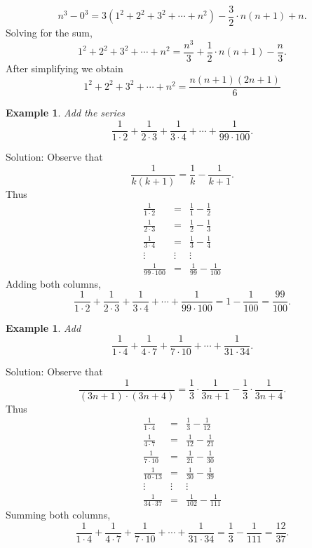 \documentclass[11pt, openany]{book}
\theoremstyle{change} \theoremheaderfont{\blue\sffamily\bfseries}
\newtheorem{exa}[thm]{Example}
\theoremstyle{nonumberplain} \theoremheaderfont{\sffamily\bfseries}
\newcommand{\í}{\'{\i}}
\begin{document}
$$n^3 - 0^3 = 3(1^2 + 2^2 + 3^2 + \cdots  + n^2) - \frac{3}{2}\cdot n(n + 1) + n.$$
Solving for the sum,
$$1^2 + 2^2 + 3^2 + \cdots + n^2 = \frac{n^3}{3}  + \frac{1}{2}\cdot n(n + 1) - \frac{n}{3}.$$
After simplifying we obtain
\begin{equation}
1^2 + 2^2 + 3^2 + \cdots + n^2 = \frac{n(n + 1)(2n + 1)}{6}
\end{equation}



\begin{exa} Add the series
$$\frac{1}{1\cdot 2} + \frac{1}{2\cdot 3} + \frac{1}{3\cdot 4} + \cdots
+ \frac{1}{99\cdot 100} .$$ \end{exa} Solution: Observe that
$$ \frac{1}{k(k + 1)} = \frac{1}{k} - \frac{1}{k + 1}.$$Thus
$$
\begin{array}{lcl}
\frac{1}{1\cdot 2} & =  &\frac{1}{1} - \frac{1}{2} \\
\frac{1}{2\cdot 3} & =  &\frac{1}{2} - \frac{1}{3} \\
\frac{1}{3\cdot 4} & =  &\frac{1}{3} - \frac{1}{4} \\
\vdots & \vdots & \vdots \\
\frac{1}{99\cdot 100} & =  &\frac{1}{99} - \frac{1}{100}
\end{array}
$$
Adding both columns,
$$\frac{1}{1\cdot 2} + \frac{1}{2\cdot 3} + \frac{1}{3\cdot 4} + \cdots
+ \frac{1}{99\cdot 100} = 1 - \frac{1}{100} = \frac{99}{100}.$$
\begin{exa} Add
$$ \frac{1}{1\cdot 4} + \frac{1}{4\cdot 7} + \frac{1}{7\cdot 10} + \cdots + \frac{1}{31\cdot 34}.$$
\end{exa}
Solution: Observe that
$$ \frac{1}{(3n + 1)\cdot (3n + 4)} = \frac{1}{3}\cdot \frac{1}{3n + 1} - \frac{1}{3}\cdot\frac{1}{3n + 4}.$$
Thus
$$
\begin{array}{lcl}
\frac{1}{1\cdot 4} & = & \frac{1}{3} - \frac{1}{12} \\
\frac{1}{4\cdot 7} & =  &\frac{1}{12} - \frac{1}{21} \\
\frac{1}{7\cdot 10} & =  &\frac{1}{21} - \frac{1}{30} \\
\frac{1}{10\cdot 13} & =  &\frac{1}{30} - \frac{1}{39} \\
\vdots & \vdots & \vdots \\
\frac{1}{34\cdot 37} & =  &\frac{1}{102} - \frac{1}{111}
\end{array}
$$
Summing both columns,
$$\frac{1}{1\cdot 4} + \frac{1}{4\cdot 7} + \frac{1}{7\cdot 10} + \cdots + \frac{1}{31\cdot 34}
= \frac{1}{3} - \frac{1}{111} = \frac{12}{37} .$$
\end{document}
